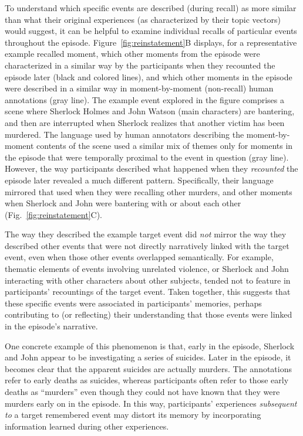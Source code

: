 \documentclass{article}
\begin{document}
To understand which specific events are described (during recall) as more similar than what their original experiences (as characterized by their topic vectors) would suggest, it can be helpful to examine individual recalls of particular events throughout the episode.  Figure~\ref{fig:reinstatement}B displays, for a representative example recalled moment, which other moments from the episode were characterized in a similar way by the participants when they recounted the episode later (black and colored lines), and which other moments in the episode were described in a similar way in moment-by-moment (non-recall) human annotations (gray line).  The example event explored in the figure comprises a scene where Sherlock Holmes and John Watson (main characters) are bantering, and then are interrupted when Sherlock realizes that another victim has been murdered.  The language used by human annotators describing the moment-by-moment contents of the scene used a similar mix of themes only for moments in the episode that were temporally proximal to the event in question (gray line).  However, the way participants described what happened when they \textit{recounted} the episode later revealed a much different pattern.  Specifically, their language mirrored that used when they were recalling other murders, and other moments when Sherlock and John were bantering with or about each other (Fig.~\ref{fig:reinstatement}C).

The way they described the example target event did \textit{not} mirror the way they described other events that were not directly narratively linked with the target event, even when those other events overlapped semantically.  For example, thematic elements of events involving unrelated violence, or Sherlock and John interacting with other characters about other subjects, tended not to feature in participants' recountings of the target event.  Taken together, this suggests that these specific events were associated in participants' memories, perhaps contributing to (or reflecting) their understanding that those events were linked in the episode's narrative.

One concrete example of this phenomenon is that, early in the episode, Sherlock and John appear to be investigating a series of suicides.  Later in the episode, it becomes clear that the apparent suicides are actually murders.  The annotations refer to early deaths as suicides, whereas participants often refer to those early deaths as ``murders'' even though they could not have known that they were murders early on in the episode.  In this way, participants' experiences \textit{subsequent to} a target remembered event may distort its memory by incorporating information learned during other experiences.
\end{document}
